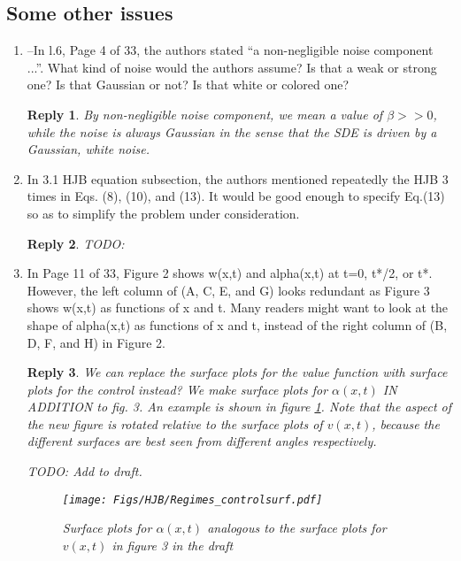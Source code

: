 \documentclass{article}
\newtheorem*{rep}{Reply}
\begin{document}
\subsection{Some other issues}
\begin{enumerate}
  \item 
--In l.6, Page 4 of 33, the authors stated “a non-negligible noise component
...”. What kind of noise would the authors assume? Is that a weak or strong one?
Is that Gaussian or not? Is that white or colored one?
\begin{rep}
By non-negligible noise component, we
mean a value of $\beta >> 0 $, while the noise is always Gaussian in the sense
that the SDE is driven by a Gaussian, white noise. 
\end{rep}


\item In 3.1 HJB equation subsection, the authors mentioned repeatedly the HJB 3
times in Eqs. (8), (10), and (13). It would be good enough to specify Eq.(13) so
as to simplify the problem under consideration.
\begin{rep}
TODO:
\end{rep}

\item In Page 11 of 33, Figure 2 shows w(x,t) and alpha(x,t) at t=0, t*/2, or t*.
However, the left column of (A, C, E, and G) looks redundant as Figure 3 shows
w(x,t) as functions of x and t. Many readers might want to look at the shape of
alpha(x,t) as functions of x and t, instead of the right column of (B, D, F, and
H) in Figure 2.
\begin{rep}
We can replace the surface plots for the value function with surface plots for
the control instead?
We make surface plots for $\alpha(x,t)$ IN ADDITION to fig. 3. An example is
shown in figure \ref{fig:HJB_control_surface}. Note that the aspect
of the new figure is rotated relative to the surface plots of $v(x,t)$, because
the different surfaces are best seen from different angles respectively.

TODO: Add to draft. 
\begin{figure}[htp]
\begin{center}
  \texttt{[image: Figs/HJB/Regimes\_controlsurf.pdf]}
  \caption[labelInTOC]{Surface plots for $\alpha(x,t)$ analogous to the surface
  plots for $v(x,t)$ in figure 3 in the draft}
  \label{fig:HJB_control_surface}
\end{center}
\end{figure} 
\end{rep}


\end{enumerate}
\end{document}
